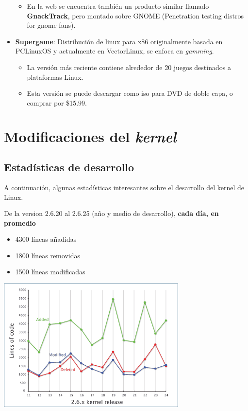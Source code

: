 \documentclass[spanish]{article}
\begin{document}
\begin{itemize}
\begin{itemize}
			\item En la web se encuentra también un producto similar llamado \textbf{GnackTrack}, pero montado sobre GNOME (Penetration testing distros for gnome fans).	
		\end{itemize}
	\item \textbf{Supergame}: Distribución de linux para x86 originalmente basada en PCLinuxOS y actualmente en VectorLinux, se enfoca en \textit{gamming}.
		\begin{itemize}
			\item La versión más reciente contiene alrededor de 20 juegos destinados a plataformas Linux.
			\item Esta versión se puede descargar como iso para DVD de doble capa, o comprar por \$15.99.
		\end{itemize}
\end{itemize}


\section{Modificaciones del \textit{kernel}} 
\subsection{Estad\'{i}sticas de desarrollo}

A continuaci\'{o}n, algunas estad\'{i}sticas interesantes sobre el desarrollo del kernel de Linux.

De la version 2.6.20 al 2.6.25 (a\~{n}o y medio de desarrollo), \textbf{cada d\'{i}a, en promedio} \cite{GregKorahHartman-GoogleTalk}
\begin{itemize}
	\item 4300 l\'{i}neas añadidas 
	\item 1800 l\'{i}neas removidas
	\item 1500 l\'{i}neas modificadas
\end{itemize}

\begin{center}
\includegraphics[width=9.5cm]{img/figure5-rateofchange.png}
\end{center}
\end{document}
